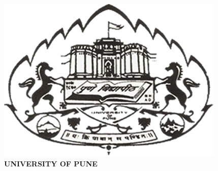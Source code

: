 \begin{center}
\includegraphics[scale=5.0]{project/images/uop-logo}\\
\LARGE{\textbf{UNIVERSITY OF PUNE}}
\newpage

\end{center}
